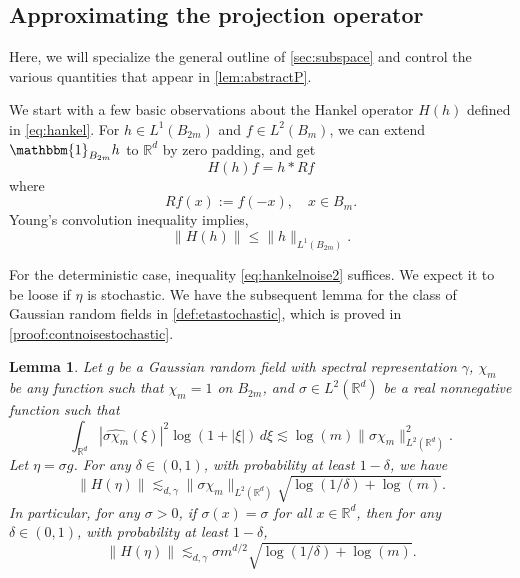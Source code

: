 \documentclass[11pt]{article}
\newtheorem{lemma}[theorem]{Lemma}
\theoremstyle{definition}
\numberwithin{theorem}{section}
\numberwithin{lemma}{section}
\numberwithin{equation}{section}
\def\R{\mathbb{R}}
\renewcommand{\hat}{\widehat}
\newcommand{\bbone}{\mathbbm{1}}
\newcommand{\norm}[1]{{\left\|#1\right\|}}
\numberwithin{equation}{section}
\begin{document}
	
	
	\subsection{Approximating the projection operator}
	\label{sec:hankelcontinuous}
	
	Here, we will specialize the general outline of \cref{sec:subspace} and control the various quantities that appear in \cref{lem:abstractP}. 
		
	We start with a few basic observations about the Hankel operator $H(h)$ defined in \cref{eq:hankel}. For $h\in L^1 (B_{2m})$ and $f\in L^2(B_m)$, we can extend $\bbone_{B_{2m}}h$ to $\R^d$ by zero padding, and get
	$$
	H(h)f=h*Rf
	$$
	where
	$$
	Rf(x):=f(-x),  \quad x\in B_m.
	$$ 
	Young's convolution inequality implies, %
	\begin{equation}\label{eq:hankelnoise2}
		\norm{H(h)}
		\leq \|h\|_{L^1(B_{2m})}. 
	\end{equation}
    
    
	For the deterministic case, inequality \eqref{eq:hankelnoise2} suffices. We expect it to be loose if $\eta$ is stochastic. We have the subsequent lemma for the class of Gaussian random fields in \cref{def:etastochastic}, which is proved in \cref{proof:contnoisestochastic}.
	
	\begin{lemma}
		\label{lem:contnoisestochastic}
		Let $g$ be a Gaussian random field with spectral representation $\gamma$, $\chi_m$ be any function such that $\chi_m=1$ on $B_{2m}$, and $\sigma\in L^2(\R^d)$ be a real nonnegative function such that 		
		\begin{equation}
			\label{eq:sigmacond0}
			\int_{\R^d} \left| \hat{\sigma \chi_m}(\xi) \right|^2 \log(1+|\xi|) \, d\xi
			\lesssim \log(m) \|\sigma \chi_m \|_{L^2(\R^d)}^2 .
		\end{equation}
		Let $\eta=\sigma g$. For any $\delta\in (0,1)$, with probability at least $1-\delta$, we have 
		$$
		\|H(\eta)\|
		\lesssim_{d, \gamma} \|\sigma\chi_m\|_{L^2(\R^d)} \sqrt{\log(1/\delta)+\log(m)}.
		$$
		In particular, for any $\sigma>0$, if $\sigma(x)=\sigma$ for all $x\in\R^d$, then for any $\delta\in (0,1)$, with probability at least $1-\delta$,
		$$
		\|H(\eta)\|
		\lesssim_{d,\gamma} \sigma m^{d/2} \sqrt{\log(1/\delta)+\log(m)}.
		$$ 
	\end{lemma}
\end{document}
